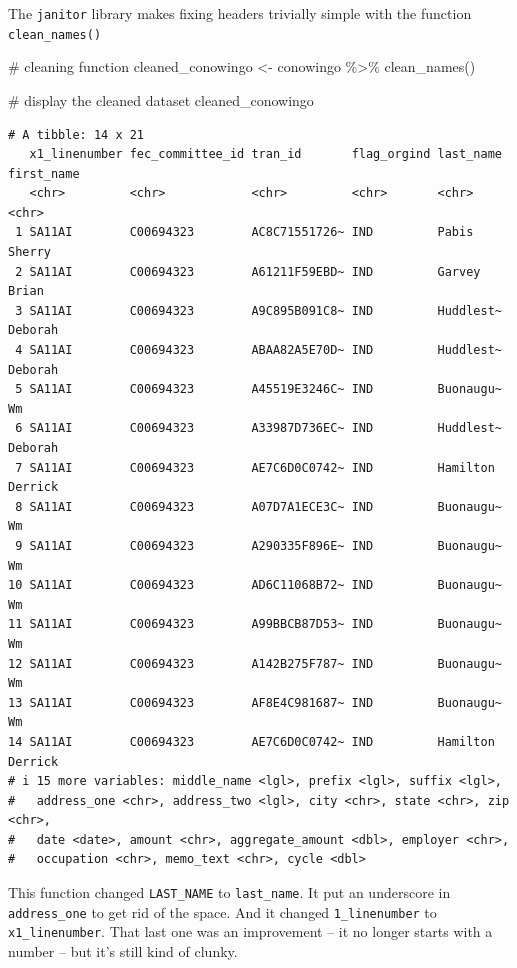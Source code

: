\documentclass[
  letterpaper,
  DIV=11,
  numbers=noendperiod]{scrreprt}
\newenvironment{Shaded}{\begin{snugshade}}{\end{snugshade}}
\newcommand{\CommentTok}[1]{\textcolor[rgb]{0.37,0.37,0.37}{#1}}
\newcommand{\FunctionTok}[1]{\textcolor[rgb]{0.28,0.35,0.67}{#1}}
\newcommand{\NormalTok}[1]{\textcolor[rgb]{0.00,0.23,0.31}{#1}}
\newcommand{\OtherTok}[1]{\textcolor[rgb]{0.00,0.23,0.31}{#1}}
\newcommand{\SpecialCharTok}[1]{\textcolor[rgb]{0.37,0.37,0.37}{#1}}
\begin{document}
The \texttt{janitor} library makes fixing headers trivially simple with
the function \texttt{clean\_names()}

\begin{Shaded}
\begin{Highlighting}[]
\CommentTok{\# cleaning function}
\NormalTok{cleaned\_conowingo }\OtherTok{\textless{}{-}}\NormalTok{ conowingo }\SpecialCharTok{\%\textgreater{}\%}
  \FunctionTok{clean\_names}\NormalTok{()}

\CommentTok{\# display the cleaned dataset}
\NormalTok{cleaned\_conowingo}
\end{Highlighting}
\end{Shaded}

\begin{verbatim}
# A tibble: 14 x 21
   x1_linenumber fec_committee_id tran_id       flag_orgind last_name first_name
   <chr>         <chr>            <chr>         <chr>       <chr>     <chr>     
 1 SA11AI        C00694323        AC8C71551726~ IND         Pabis     Sherry    
 2 SA11AI        C00694323        A61211F59EBD~ IND         Garvey    Brian     
 3 SA11AI        C00694323        A9C895B091C8~ IND         Huddlest~ Deborah   
 4 SA11AI        C00694323        ABAA82A5E70D~ IND         Huddlest~ Deborah   
 5 SA11AI        C00694323        A45519E3246C~ IND         Buonaugu~ Wm        
 6 SA11AI        C00694323        A33987D736EC~ IND         Huddlest~ Deborah   
 7 SA11AI        C00694323        AE7C6D0C0742~ IND         Hamilton  Derrick   
 8 SA11AI        C00694323        A07D7A1ECE3C~ IND         Buonaugu~ Wm        
 9 SA11AI        C00694323        A290335F896E~ IND         Buonaugu~ Wm        
10 SA11AI        C00694323        AD6C11068B72~ IND         Buonaugu~ Wm        
11 SA11AI        C00694323        A99BBCB87D53~ IND         Buonaugu~ Wm        
12 SA11AI        C00694323        A142B275F787~ IND         Buonaugu~ Wm        
13 SA11AI        C00694323        AF8E4C981687~ IND         Buonaugu~ Wm        
14 SA11AI        C00694323        AE7C6D0C0742~ IND         Hamilton  Derrick   
# i 15 more variables: middle_name <lgl>, prefix <lgl>, suffix <lgl>,
#   address_one <chr>, address_two <lgl>, city <chr>, state <chr>, zip <chr>,
#   date <date>, amount <chr>, aggregate_amount <dbl>, employer <chr>,
#   occupation <chr>, memo_text <chr>, cycle <dbl>
\end{verbatim}

This function changed \texttt{LAST\_NAME} to \texttt{last\_name}. It put
an underscore in \texttt{address\_one} to get rid of the space. And it
changed \texttt{1\_linenumber} to \texttt{x1\_linenumber}. That last one
was an improvement -- it no longer starts with a number -- but it's
still kind of clunky.
\end{document}
